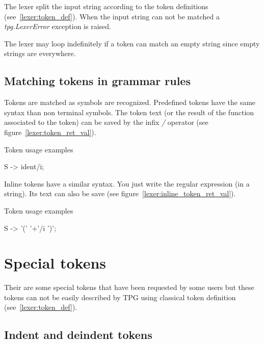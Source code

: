The lexer split the input string according to the token definitions (see~\ref{lexer:token_def}). When the input string can not be matched a \emph{tpg.LexerError} exception is raised.

The lexer may loop indefinitely if a token can match an empty string since empty strings are everywhere.

\subsection{Matching tokens in grammar rules}

Tokens are matched as symbols are recognized.
Predefined tokens have the same syntax than non terminal symbols.
The token text (or the result of the function associated to the token) can be saved by the infix \emph{/} operator (see figure~\ref{lexer:token_ret_val}).

\begin{code}
\caption{Token usage examples}								\label{lexer:token_ret_val}
\begin{verbatimtab}[4]
	S -> ident/i;
\end{verbatimtab}
\end{code}

Inline tokens have a similar syntax. You just write the regular expression (in a string). Its text can also be save (see figure~\ref{lexer:inline_token_ret_val}).

\begin{code}
\caption{Token usage examples}								\label{lexer:inline_token_ret_val}
\begin{verbatimtab}[4]
	S -> '(' '\w+'/i ')';
\end{verbatimtab}
\end{code}

\section{Special tokens}                                    \label{lexer:special_tokens}

Their are some special tokens that have been requested by some users but these tokens can not be easily
described by TPG using classical token definition (see~\ref{lexer:token_def}).

\subsection{Indent and deindent tokens}                     \label{lexer:indent_deindent}

